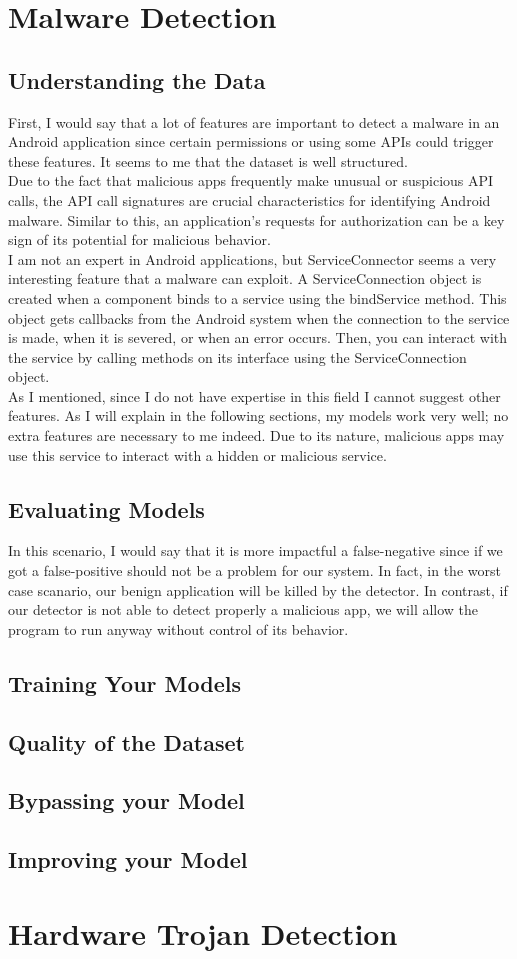 \documentclass[unicode,11pt,a4paper,oneside,numbers=endperiod,openany]{scrartcl}
\begin{document}
\setassignment

\newline
\section{Malware Detection}


\subsection{Understanding the Data}
First, I would say that a lot of features are important to detect a malware in an Android application since certain permissions or using some APIs could trigger these features. It seems to me that the dataset is well structured.  \\
Due to the fact that malicious apps frequently make unusual or suspicious API calls, the API call signatures are crucial characteristics for identifying Android malware. Similar to this, an application's requests for authorization can be a key sign 
of its potential for malicious behavior. \\
I am not an expert in Android applications, but ServiceConnector seems a very interesting feature that a malware can exploit. 
A ServiceConnection object is created when a component binds to a service using the bindService method. This object gets callbacks from the Android system when the connection to the service is made, when it is severed, or when an error occurs. Then, you can interact with the service by calling methods on its interface using the ServiceConnection object.\\
As I mentioned, since I do not have expertise in this field I cannot suggest other features. As I will explain in the following sections, my models work very well; no extra features are necessary to me indeed.
Due to its nature, malicious apps may use this service to interact with a hidden or malicious service.
\subsection{Evaluating Models}
In this scenario, I would say that it is more impactful a false-negative since if we got a false-positive should not be a problem for our system. In fact, in the worst case scanario, our benign application will be killed by the detector. In contrast, if our detector is not able to detect properly a malicious app, we will allow the program to run anyway without control of its behavior. \\

\subsection{Training Your Models}
\subsection{Quality of the Dataset}
\subsection{Bypassing your Model}
\subsection{Improving your Model}
\section{Hardware Trojan Detection}
\end{document}
